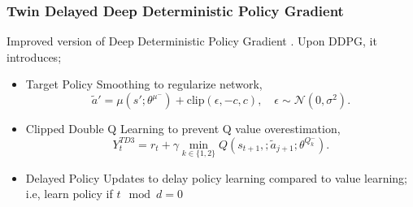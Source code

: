 \documentclass{beamer}
\begin{document}

\begin{frame}
\frametitle{Twin Delayed Deep Deterministic Policy Gradient}
Improved version of Deep Deterministic Policy Gradient \cite{fujimoto_addressing_2018}.
Upon DDPG, it introduces;
\begin{itemize}
	\item Target Policy Smoothing to regularize network,
	\begin{equation}
	\label{eqn:td3_target_action}
	\widetilde{a}' = \mu(s';\theta^{\mu^-}) + \text{clip}(\epsilon, -c, c), \quad \epsilon \sim \mathcal{N}(0, \sigma^2).
	\end{equation}
	\item Clipped Double Q Learning to prevent Q value overestimation,
	\begin{equation}
	\label{eqn:td3_target}
	Y_t^{TD3} = r_t + \gamma \min_{k\in\{1,2\}} Q(s_{t+1}, ;\widetilde{a}_{j+1};\theta^{Q_k^-}).
	\end{equation}
	\item Delayed Policy Updates to delay policy learning compared to value learning; i.e, learn policy if $t\mod d = 0$
\end{itemize}
\end{frame}
\end{document}
